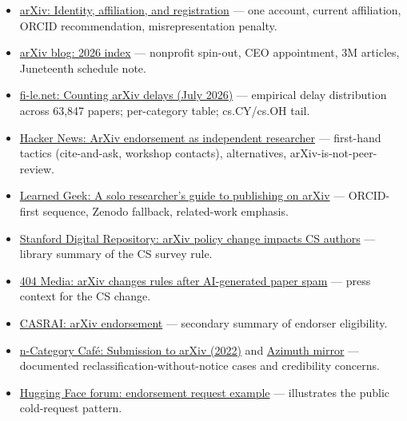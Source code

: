 \documentclass[twocolumn,10pt,letterpaper]{article}
\begin{document}
\begin{itemize}
  \item \href{https://info.arxiv.org/help/policies/identity\_and\_affiliation.html}{arXiv: Identity, affiliation, and registration} — one account, current affiliation, ORCID recommendation, misrepresentation penalty.
  \item \href{https://blog.arxiv.org/2026/}{arXiv blog: 2026 index} — nonprofit spin-out, CEO appointment, 3M articles, Juneteenth schedule note.
  \item \href{https://fi-le.net/arxiv/}{fi-le.net: Counting arXiv delays (July 2026)} — empirical delay distribution across 63,847 papers; per-category table; cs.CY/cs.OH tail.
  \item \href{https://news.ycombinator.com/item?id=46243256}{Hacker News: ArXiv endorsement as independent researcher} — first-hand tactics (cite-and-ask, workshop contacts), alternatives, arXiv-is-not-peer-review.
  \item \href{https://learnedgeek.com/Blog/Post/solo-researcher-guide-arxiv}{Learned Geek: A solo researcher's guide to publishing on arXiv} — ORCID-first sequence, Zenodo fallback, related-work emphasis.
  \item \href{https://sdr.library.stanford.edu/news/arxiv-policy-change-impacts-computer-science-authors}{Stanford Digital Repository: arXiv policy change impacts CS authors} — library summary of the CS survey rule.
  \item \href{https://www.404media.co/arxiv-changes-rules-after-getting-spammed-with-ai-generated-research-papers/}{404 Media: arXiv changes rules after AI-generated paper spam} — press context for the CS change.
  \item \href{https://casrai.org/dictionary/term/arxiv-endorsement-system}{CASRAI: arXiv endorsement} — secondary summary of endorser eligibility.
  \item \href{https://golem.ph.utexas.edu/category/2022/02/submission\_to\_arxiv.html}{n-Category Café: Submission to arXiv (2022)} and \href{https://johncarlosbaez.wordpress.com/2022/02/04/submission-to-arxiv/}{Azimuth mirror} — documented reclassification-without-notice cases and credibility concerns.
  \item \href{https://discuss.huggingface.co/t/seeking-arxiv-cs-ai-endorsement-independent-researcher-preprint-on-emergent-identities-in-llms/168007}{Hugging Face forum: endorsement request example} — illustrates the public cold-request pattern.
\end{itemize}


\balance
\end{document}
